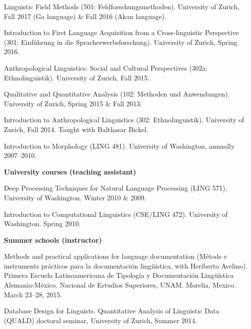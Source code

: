 \documentclass[11pt]{article}
\newcommand{\hangpara}{
 \setlength{\parindent}{0in} %
 \hangindent=0.42in %
}
\begin{document}
\vskip 6pt
\hangpara Linguistic Field Methods (501: Feldforschungsmethoden). University of Zurich, Fall 2017 (Ga language) \& Fall 2016 (Akan language).

\vskip 6pt
\hangpara Introduction to First Language Acquisition from a Cross-linguistic Perspective (301: Einf{\"u}hrung in die Spracherwerbsforschung). University of Zurich, Spring 2016.

\vskip 6pt
\hangpara Anthropological Linguistics: Social and Cultural Perspectives (302a: Ethnolinguistik). University of Zurich, Fall 2015.

\vskip 6pt
\hangpara Qualitative and Quantitative Analysis (102: Methoden und Anwendungen). University of Zurich, Spring 2015 \& Fall 2013.

\vskip 6pt
\hangpara Introduction to Anthropological Linguistics (302: Ethnolinguistik). University of Zurich, Fall 2014. Taught with Balthasar Bickel.

\vskip 6pt
\hangpara Introduction to Morphology (LING 481). University of Washington, annually 2007--2010.

\begin{flushleft}
{\bf University courses (teaching assistant)}
\end{flushleft}
\hangpara Deep Processing Techniques for Natural Language Processing (LING 571). University of Washington. Winter 2010 \& 2009.

\vskip 6pt
\hangpara %
Introduction to Computational Linguistics (CSE/LING 472). University of Washington. Spring 2010.

\begin{flushleft}
{\bf Summer schools (instructor)}
\end{flushleft}
\hangpara Methods and practical applications for language documentation (M{\'e}tods e instruments pr{\'a}cticos para la documentaci{\'o}n ling{\"u}{\'i}stica, with Heriberto Avelino). Primera Escuela Latinoamericana de Tipolog{\'i}a y Documentaci{\'o}n Ling{\"u}{\'i}stica Alemania-M{\'e}xico. Nacional de Estudios Superiores, UNAM. Morelia, Mexico. March 23--28, 2015.

\vskip 6pt
\hangpara Database Design for Linguists. Quantitative Analysis of Linguistic Data (QUALD) doctoral seminar, University of Zurich, Summer 2014.
\end{document}
